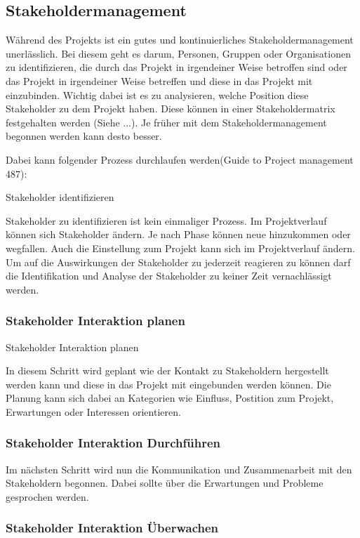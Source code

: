 \documentclass[12pt,oneside]{article}
\begin{document}
\subsection{Stakeholdermanagement}

Während des Projekts ist ein gutes und kontinuierliches Stakeholdermanagement unerlässlich. 
Bei diesem geht es darum, Personen, Gruppen oder Organisationen zu identifizieren, die durch das Projekt in irgendeiner Weise betroffen sind oder das
Projekt in irgendeiner Weise betreffen und diese in das Projekt mit einzubinden. Wichtig dabei ist es zu analysieren, welche Position 
diese Stakeholder zu dem Projekt haben. Diese können in einer Stakeholdermatrix festgehalten werden (Siehe ...). 
Je früher mit dem Stakeholdermanagement begonnen werden kann desto besser.

Dabei kann folgender Prozess durchlaufen werden(Guide to Project management 487):

Stakeholder identifizieren

Stakeholder zu identifizieren ist kein einmaliger Prozess. Im Projektverlauf können sich Stakeholder ändern. 
Je nach Phase können neue hinzukommen oder wegfallen. Auch die Einstellung zum Projekt kann sich im Projektverlauf ändern. 
Um auf die Auswirkungen der Stakeholder zu jederzeit reagieren zu können darf die Identifikation und Analyse der Stakeholder 
zu keiner Zeit vernachlässigt werden.

\subsubsection{Stakeholder Interaktion planen}
Stakeholder Interaktion planen

In diesem Schritt wird geplant wie der Kontakt zu Stakeholdern hergestellt werden kann und diese in das Projekt mit eingebunden werden können. 
Die Planung kann sich dabei an Kategorien wie Einfluss, Postition zum Projekt, Erwartungen oder Interessen orientieren.

\subsubsection{Stakeholder Interaktion Durchführen}


Im nächsten Schritt wird nun die Kommunikation und Zusammenarbeit mit den Stakeholdern begonnen. 
Dabei sollte über die Erwartungen und Probleme gesprochen werden.

\subsubsection{Stakeholder Interaktion Überwachen}
\end{document}
